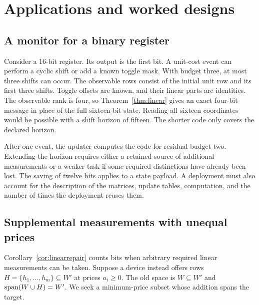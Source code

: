 \section{Applications and worked designs}\label{sec:applications}
\subsection{A monitor for a binary register}
Consider a 16-bit register. Its output is the first bit. A unit-cost event can perform a cyclic shift or add a known toggle mask. With budget three, at most three shifts can occur. The observable rows consist of the initial unit row and its first three shifts. Toggle offsets are known, and their linear parts are identities. The observable rank is four, so Theorem~\ref{thm:linear} gives an exact four-bit message in place of the full sixteen-bit state. Reading all sixteen coordinates would be possible with a shift horizon of fifteen. The shorter code only covers the declared horizon.

After one event, the updater computes the code for residual budget two. Extending the horizon requires either a retained source of additional measurements or a weaker task if some required distinctions have already been lost. The saving of twelve bits applies to a state payload. A deployment must also account for the description of the matrices, update tables, computation, and the number of times the deployment reuses them.

\subsection{Supplemental measurements with unequal prices}
Corollary~\ref{cor:linearrepair} counts bits when arbitrary required linear measurements can be taken. Suppose a device instead offers rows $H=\{h_1,\ldots,h_m\}\subseteq W'$ at prices $a_i\ge0$. The old space is $W\subseteq W'$ and $\operatorname{span}(W\cup H)=W'$. We seek a minimum-price subset whose addition spans the target.

